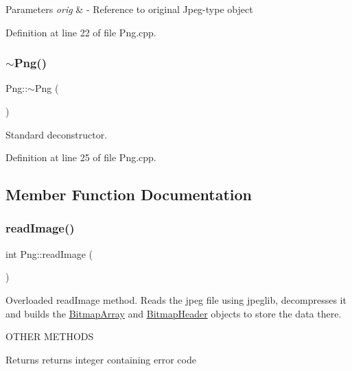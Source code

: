 \begin{DoxyParams}{Parameters}
{\em orig} & -\/ Reference to original Jpeg-\/type object \\
\hline
\end{DoxyParams}


Definition at line 22 of file Png.\+cpp.

\mbox{\label{classPng_ad26b67ca927b367d4bc294b07f16868d}} 
\subsubsection{\texorpdfstring{$\sim$Png()}{~Png()}}
{\footnotesize\ttfamily Png\+::$\sim$\+Png (\begin{DoxyParamCaption}{ }\end{DoxyParamCaption})\hspace{0.3cm}{\ttfamily [virtual]}}

Standard deconstructor. 

Definition at line 25 of file Png.\+cpp.



\subsection{Member Function Documentation}
\mbox{\label{classPng_aa38d2a6baa44bd0b3a932b93ee67e419}} 
\subsubsection{\texorpdfstring{readImage()}{readImage()}}
{\footnotesize\ttfamily int Png\+::read\+Image (\begin{DoxyParamCaption}{ }\end{DoxyParamCaption})\hspace{0.3cm}{\ttfamily [virtual]}}



Overloaded read\+Image method. Reads the jpeg file using jpeglib, decompresses it and builds the \mbox{\hyperlink{classBitmapArray}{Bitmap\+Array}} and \mbox{\hyperlink{classBitmapHeader}{Bitmap\+Header}} objects to store the data there. 

O\+T\+H\+ER M\+E\+T\+H\+O\+DS\begin{DoxyReturn}{Returns}
returns integer containing error code 
\end{DoxyReturn}



